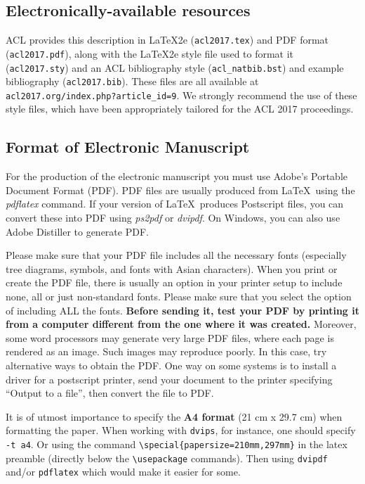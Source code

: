 \documentclass[11pt,a4paper]{article}
\begin{document}
\subsection{Electronically-available resources}

ACL provides this description in \LaTeX2e{} ({\small\tt acl2017.tex}) and PDF
format ({\small\tt acl2017.pdf}), along with the \LaTeX2e{} style file used to
format it ({\small\tt acl2017.sty}) and an ACL bibliography style ({\small\tt acl\_natbib.bst})
and example bibliography ({\small\tt acl2017.bib}).
These files are all available at
{\small\tt acl2017.org/index.php?article\_id=9}. We
strongly recommend the use of these style files, which have been
appropriately tailored for the ACL 2017 proceedings.

\subsection{Format of Electronic Manuscript}
\label{sect:pdf}

For the production of the electronic manuscript you must use Adobe's
Portable Document Format (PDF). PDF files are usually produced from
\LaTeX\ using the \textit{pdflatex} command. If your version of
\LaTeX\ produces Postscript files, you can convert these into PDF
using \textit{ps2pdf} or \textit{dvipdf}. On Windows, you can also use
Adobe Distiller to generate PDF.

Please make sure that your PDF file includes all the necessary fonts
(especially tree diagrams, symbols, and fonts with Asian
characters). When you print or create the PDF file, there is usually
an option in your printer setup to include none, all or just
non-standard fonts.  Please make sure that you select the option of
including ALL the fonts. \textbf{Before sending it, test your PDF by
  printing it from a computer different from the one where it was
  created.} Moreover, some word processors may generate very large PDF
files, where each page is rendered as an image. Such images may
reproduce poorly. In this case, try alternative ways to obtain the
PDF. One way on some systems is to install a driver for a postscript
printer, send your document to the printer specifying ``Output to a
file'', then convert the file to PDF.

It is of utmost importance to specify the \textbf{A4 format} (21 cm
x 29.7 cm) when formatting the paper. When working with
{\tt dvips}, for instance, one should specify {\tt -t a4}.
Or using the command \verb|\special{papersize=210mm,297mm}| in the latex
preamble (directly below the \verb|\usepackage| commands). Then using 
{\tt dvipdf} and/or {\tt pdflatex} which would make it easier for some.
\end{document}

